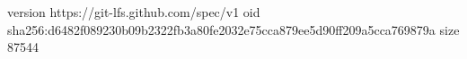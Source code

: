 version https://git-lfs.github.com/spec/v1
oid sha256:d6482f089230b09b2322fb3a80fe2032e75cca879ee5d90ff209a5cca769879a
size 87544
